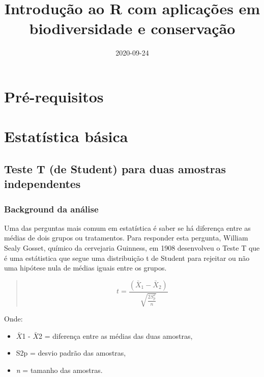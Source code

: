 \documentclass[
]{book}
\title{Introdução ao R com aplicações em biodiversidade e conservação}
\author{}
\date{\vspace{-2.5em}2020-09-24}
\begin{document}
\maketitle

{
\setcounter{tocdepth}{1}
\tableofcontents
}
\hypertarget{pruxe9-requisitos}{%
\chapter{Pré-requisitos}\label{pruxe9-requisitos}}

\hypertarget{estatuxedstica-buxe1sica}{%
\chapter{Estatística básica}\label{estatuxedstica-buxe1sica}}

\hypertarget{teste-t-de-student-para-duas-amostras-independentes}{%
\section{Teste T (de Student) para duas amostras independentes}\label{teste-t-de-student-para-duas-amostras-independentes}}

\hypertarget{background-da-anuxe1lise}{%
\subsection{Background da análise}\label{background-da-anuxe1lise}}

Uma das perguntas mais comum em estatística é saber se há diferença entre as médias de dois grupos ou tratamentos. Para responder esta pergunta, William Sealy Gosset, químico da cervejaria Guinness, em 1908 desenvolveu o Teste T que é uma estátistica que segue uma distribuição t de Student para rejeitar ou não uma hipótese nula de médias iguais entre os grupos.

\begin{quote}
\[ t = \frac{(\bar{X}_1 - \bar{X}_2)}{\sqrt{\frac{2S^2_p}{n}}}\]
\end{quote}

Onde:

\begin{itemize}
\item
  \(\bar{X}\)1 - \(\bar{X}\)2 = diferença entre as médias das duas amostras,
\item
  S2p = desvio padrão das amostras,
\item
  \emph{n} = tamanho das amostras.
\end{itemize}
\end{document}
